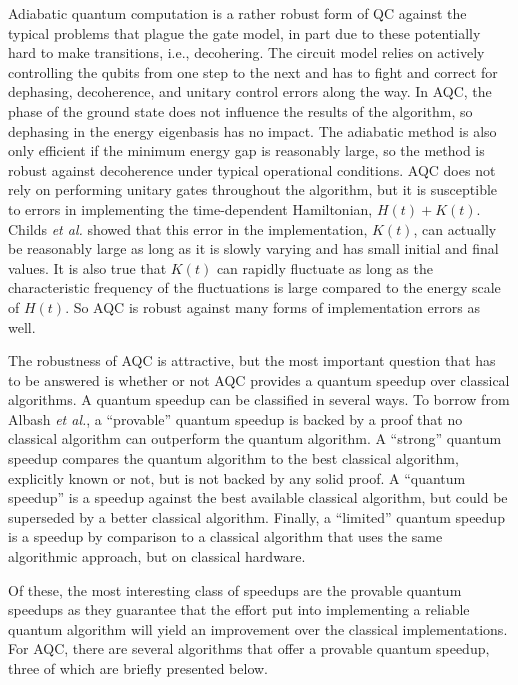 \documentclass[%
 reprint,
 amsmath,amssymb,
 aps,
]{revtex4-1}
\begin{document}
   Adiabatic quantum computation is a rather robust form of QC against the typical problems that plague the gate model, in part due to these potentially hard to make transitions, i.e., decohering. The circuit model relies on actively controlling the qubits from one step to the next and has to fight and correct for dephasing, decoherence, and unitary control errors along the way. In AQC, the phase of the ground state does not influence the results of the algorithm, so dephasing in the energy eigenbasis has no impact. The adiabatic method is also only efficient if the minimum energy gap is reasonably large, so the method is robust against decoherence under typical operational conditions\cite{Childs2001}. AQC does not rely on performing unitary gates throughout the algorithm, but it is susceptible to errors in implementing the time-dependent Hamiltonian, $H(t) + K(t)$. Childs \textit{et al.} showed that this error in the implementation, $K(t)$, can actually be reasonably large as long as it is slowly varying and has small initial and final values. It is also true that $K(t)$ can rapidly fluctuate as long as the characteristic frequency of the fluctuations is large compared to the energy scale of $H(t)$. So AQC is robust against many forms of implementation errors as well.
   
   The robustness of AQC is attractive, but the most important question that has to be answered is whether or not AQC provides a quantum speedup over classical algorithms. A quantum speedup can be classified in several ways\cite{RevModPhys.90.015002}. To borrow from Albash \textit{et al.}, a ``provable'' quantum speedup is backed by a proof that no classical algorithm can outperform the quantum algorithm. A ``strong'' quantum speedup compares the quantum algorithm to the best classical algorithm, explicitly known or not, but is not backed by any solid proof. A ``quantum speedup'' is a speedup against the best available classical algorithm, but could be superseded by a better classical algorithm. Finally, a ``limited'' quantum speedup is a speedup by comparison to a classical algorithm that uses the same algorithmic approach, but on classical hardware.
   
   Of these, the most interesting class of speedups are the provable quantum speedups as they guarantee that the effort put into implementing a reliable quantum algorithm will yield an improvement over the classical implementations. For AQC, there are several algorithms that offer a provable quantum speedup, three of which are briefly presented below.
   
\end{document}
